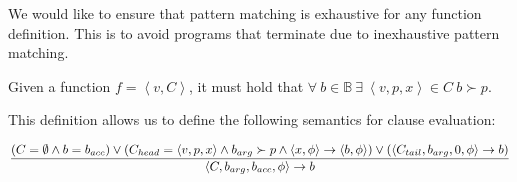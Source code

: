 

We would like to ensure that pattern matching is exhaustive for any function
definition. This is to avoid programs that terminate due to inexhaustive
pattern matching.

\begin{definition} Given a function $f=\left\langle v, C\right\rangle$, it must
hold that $\forall\ b\in\mathbb{B}\ \exists\ \left\langle v,p,x \right\rangle
\in C\ b\succ p$.\end{definition}

This definition allows us to define the following semantics for clause
evaluation:

\begin{equation}
{\displaystyle
  \left(
      C=\emptyset
    \wedge
      b=b_{acc}
  \right)
  \vee
  \left(
      C_{head}=\left\langle v,p,x\right\rangle
    \wedge
      b_{arg}\succ p
    \wedge
      \left\langle x,\phi\right\rangle
      \rightarrow
      \left\langle b,\phi\right\rangle
  \right)
  \vee
  \left(
      \left\langle C_{tail},b_{arg},0,\phi\right\rangle
      \rightarrow
      b
  \right)
\over\displaystyle
  \left\langle C,b_{arg},b_{acc},\phi\right\rangle
  \rightarrow
  b
}
\end{equation}
